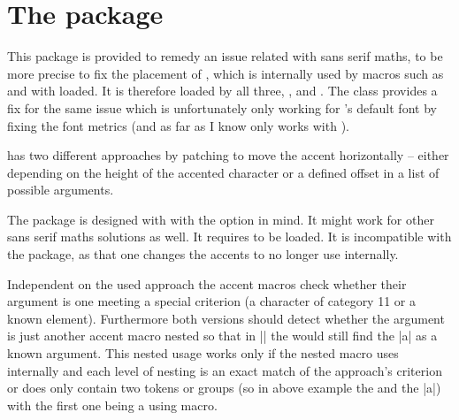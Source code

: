 \chapter{The  package}\label{sec:sfacc}
This package is provided to remedy an issue related with sans serif maths, to be
more precise to fix the placement of , which is internally used
by macros such as  and  with  loaded. It is
therefore loaded by all three, ,  and
. The  class provides a fix for the same issue which
is unfortunately only working for 's default font by fixing the font
metrics (and as far as I know only works with ).

 has two different approaches by patching  to move
the accent horizontally -- either depending on the height of the accented
character or a defined offset in a list of possible arguments.

The package is designed with  with the  option in
mind. It might work for other sans serif maths solutions as well. It requires
 to be loaded. It is incompatible with the  package,
as that one changes the accents to no longer use  internally.

Independent on the used approach the accent macros check whether their argument
is one meeting a special criterion (a character of category 11 or a known
element). Furthermore both versions should detect whether the argument is just
another accent macro nested so that in \bverb|| the  would
still find the |a| as a known argument. This nested usage works only if the
nested macro uses  internally and each level of nesting is an
exact match of the approach's criterion or does only contain two tokens or
groups (so in above example the  and the |{a}|) with the first one being
a  using macro.

